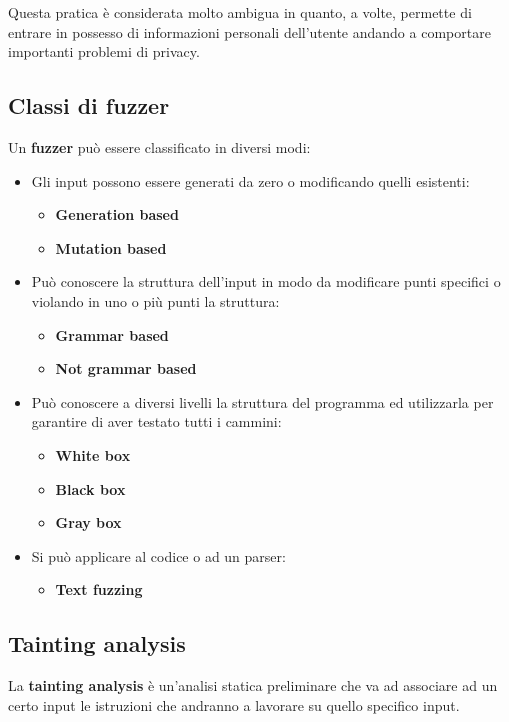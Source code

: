 Questa pratica è considerata molto ambigua in quanto, a volte, permette di entrare in possesso di informazioni
personali dell'utente andando a comportare importanti problemi di privacy.

\subsection{Classi di fuzzer}
Un \textbf{fuzzer} può essere classificato in diversi modi:
\begin{itemize}
	\item Gli input possono essere generati da zero o modificando quelli esistenti:
	      \begin{itemize}
		      \item \textbf{Generation based}
		      \item \textbf{Mutation based}
	      \end{itemize}
	\item Può conoscere la struttura dell'input in modo da modificare punti specifici o violando in uno o più punti
	      la struttura:
	      \begin{itemize}
		      \item \textbf{Grammar based}
		      \item \textbf{Not grammar based}
	      \end{itemize}
	\item Può conoscere a diversi livelli la struttura del programma ed utilizzarla per garantire di aver testato tutti
	      i cammini:
	      \begin{itemize}
		      \item \textbf{White box}
		      \item \textbf{Black box}
		      \item \textbf{Gray box}
	      \end{itemize}
	\item Si può applicare al codice o ad un parser:
	      \begin{itemize}
		      \item \textbf{Text fuzzing}
	      \end{itemize}
\end{itemize}

\subsection{Tainting analysis}
La \textbf{tainting analysis} è un'analisi statica preliminare che va ad associare ad un certo input le istruzioni che
andranno a lavorare su quello specifico input.

